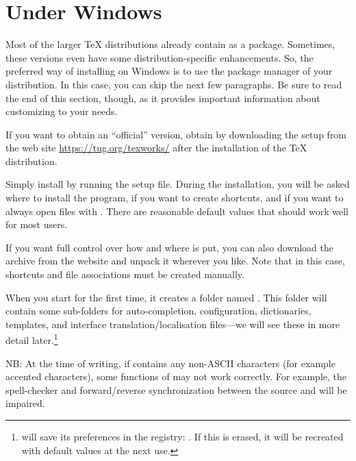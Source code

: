 \section{Under Windows}

Most of the larger {\TeX} distributions already contain {\Tw} as a package. Sometimes, these versions even have some distribution-specific enhancements. So, the preferred way of installing {\Tw} on Windows is to use the package manager of your distribution. In this case, you can skip the next few paragraphs. Be sure to read the end of this section, though, as it provides important information about customizing {\Tw} to your needs.

If you want to obtain an ``official'' version, obtain {\Tw} by downloading the setup from the {\Tw} web site \url{https://tug.org/texworks/} after the installation of the {\TeX} distribution.

Simply install {\Tw} by running the setup file. During the installation, you will be asked where to install the program, if you want to create shortcuts, and if you want to always open  files with {\Tw}. There are reasonable default values that should work well for most users.

If you want full control over how and where {\Tw} is put, you can also download the  archive from the website and unpack it wherever you like. Note that in this case, shortcuts and file associations must be created manually.

\urldef{\TwRegistryPath}

When you start {\Tw} for the first time, it creates a folder named . This folder will contain some sub-folders for auto-completion, configuration, dictionaries, templates, and interface translation/localisation files---we will see these in more detail later.\footnote{{\Tw} will save its preferences in the registry:
\TwRegistryPath. If this is erased, it will be recreated with default values at the next use.}

NB: At the time of writing, if  contains any non-ASCII characters (for example accented characters), some functions of {\Tw} may not work correctly. For example, the spell-checker and forward/reverse synchronization between the source and  will be impaired.

